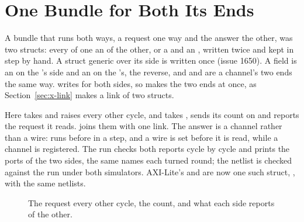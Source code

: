 \section{One Bundle for Both Its Ends}
\label{sec:x-flipped}

A bundle that runs both ways, a request one way and the answer the
other, was two structs: every  of one an  of the
other, or a  and an , written twice and kept in step
by hand. A struct generic over its side is written once (issue 1650).
A field  is an  on the
's side and an  on the 's,
 the reverse, and  and
 are a channel's two ends the same way.
 writes  for both sides, so
 makes the two ends at once, as
Section~\ref{sec:x-link} makes a link of two structs.

Here  takes  and raises 
every other cycle, and  takes , sends
its count on  and reports the request it reads.
 joins them with one link. The answer is a channel rather
than a wire:  runs before  in a step, and a wire is
set before it is read, while a channel is registered. The run checks
both reports cycle by cycle and prints the ports of the two sides, the
same names each turned round; the netlist is checked against the run
under both simulators. AXI-Lite's  and
 are now one such struct, , with the
same netlists.

\begin{figure}[htbp]
\centering

\caption{The request every other cycle, the count, and what each side
reports of the other.}
\label{fig:x-flipped}
\end{figure}




